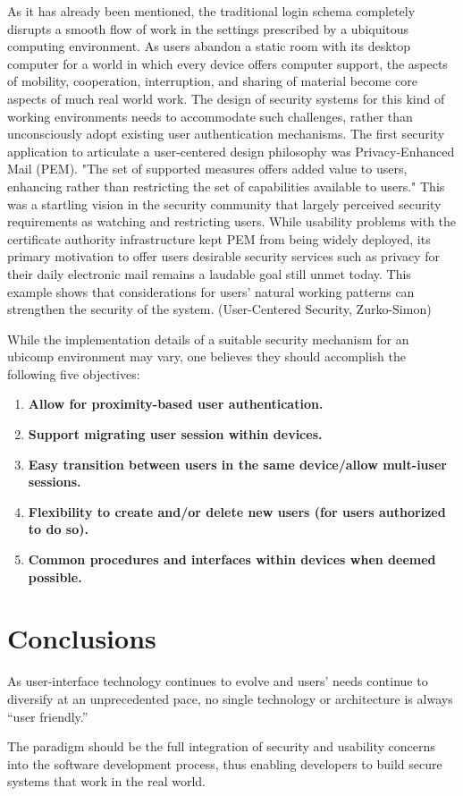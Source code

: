 \documentclass{article}
\begin{document}
As it has already been mentioned, the traditional login schema completely disrupts a smooth flow of work in the settings prescribed by a ubiquitous computing environment. As users abandon a static room with its desktop computer for a world in which every device offers computer support, the aspects of mobility, cooperation, interruption, and sharing of material become core aspects of much real world work. The design of security systems for this kind of working environments needs to accommodate such challenges, rather than unconsciously adopt existing user authentication mechanisms.
The first security application to articulate a user-centered design philosophy was Privacy-Enhanced Mail (PEM).\cite{linn} "The set of supported measures offers added value to users, enhancing rather than restricting the set of capabilities available to users." This was a startling vision in the security community that largely perceived security requirements as watching and restricting users. While usability problems with the certificate authority infrastructure kept PEM from being widely deployed, its primary motivation to offer users desirable security services such as privacy for their daily electronic mail remains a laudable goal still  unmet today.  This example shows that considerations for users' natural working patterns can strengthen the security of the system. (User-Centered Security, Zurko-Simon)
 
While the implementation details of a suitable security mechanism for an ubicomp environment may vary, one believes they should accomplish the following five objectives:

\begin{enumerate}
 \item \textbf{Allow for proximity-based user authentication.}
 \item \textbf{Support migrating user session within devices.}
 \item \textbf{Easy transition between users in the same device/allow mult-iuser sessions.}  
 \item \textbf{Flexibility to create and/or delete new users (for users authorized to do so).}
 \item \textbf{Common procedures and interfaces within devices when deemed possible.}
\end{enumerate}

\section{Conclusions}
As user-interface technology continues to evolve and users' needs continue to diversify at an unprecedented pace, no single technology or architecture is always ``user friendly.” 

The paradigm should be the full integration of security and usability concerns into the software development process, thus enabling developers to build secure systems that work in the real world. \cite{flechais}



\end{document}
